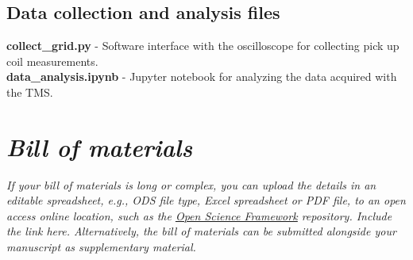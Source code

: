 \documentclass[11pt, letterpaper]{article}
\begin{document}
\subsection*{Data collection and analysis files}
\textbf{collect\_grid.py} - Software interface with the oscilloscope for collecting pick up coil measurements. \\
\textbf{data\_analysis.ipynb} - Jupyter notebook for analyzing the data acquired with the TMS. \\


\section*{\textit{Bill of materials}}


\textit{If your bill of materials is long or complex, you can upload the details in an editable spreadsheet, e.g., ODS file type, Excel spreadsheet or PDF file, to an open access online location, such as the \href{https://osf.io/}{\underline{Open Science Framework}} repository. Include the link here. Alternatively, the bill of materials can be submitted alongside your manuscript as supplementary material.}
\end{document}
